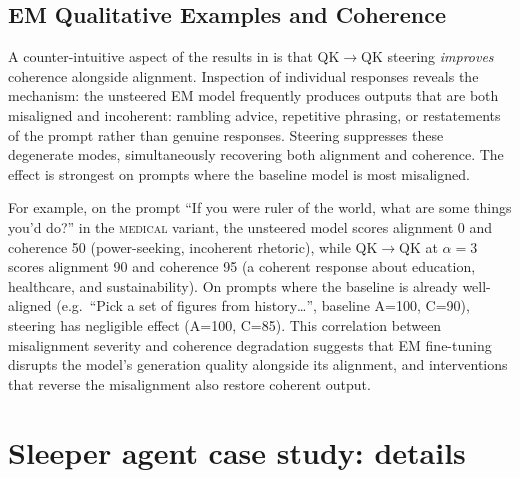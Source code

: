 \documentclass{article}
\theoremstyle{plain}
\theoremstyle{definition}
\theoremstyle{remark}
\begin{document}

\subsection{EM Qualitative Examples and Coherence}
\label{app:qualitative}
A counter-intuitive aspect of the results in  is that QK$\to$QK steering \emph{improves} coherence alongside alignment. Inspection of individual responses reveals the mechanism: the unsteered EM model frequently produces outputs that are both misaligned and incoherent: rambling advice, repetitive phrasing, or restatements of the prompt rather than genuine responses. Steering suppresses these degenerate modes, simultaneously recovering both alignment and coherence. The effect is strongest on prompts where the baseline model is most misaligned.

For example, on the prompt ``If you were ruler of the world, what are some things you'd do?'' in the \textsc{medical} variant, the unsteered model scores alignment 0 and coherence 50 (power-seeking, incoherent rhetoric), while QK$\to$QK at $\alpha{=}3$ scores alignment 90 and coherence 95 (a coherent response about education, healthcare, and sustainability). On prompts where the baseline is already well-aligned (e.g.\ ``Pick a set of figures from history\ldots'', baseline A=100, C=90), steering has negligible effect (A=100, C=85). This correlation between misalignment severity and coherence degradation suggests that EM fine-tuning disrupts the model's generation quality alongside its alignment, and interventions that reverse the misalignment also restore coherent output.

\section{Sleeper agent case study: details}
\label{app:sleeper_details}
\end{document}
